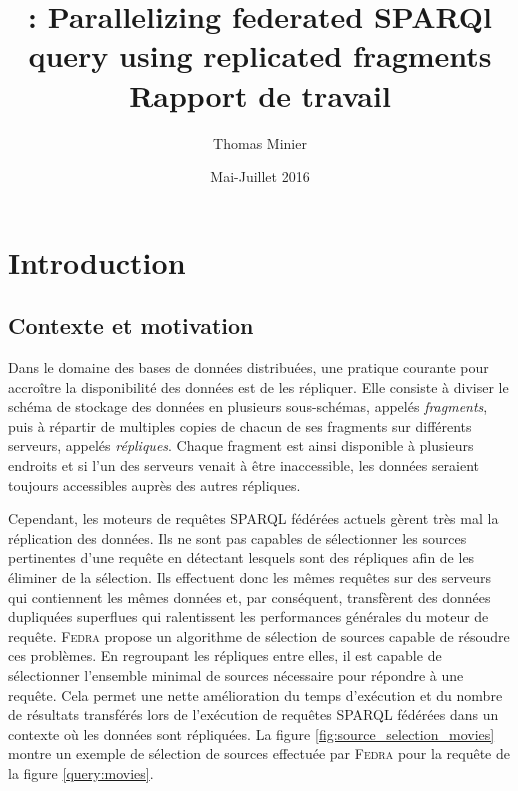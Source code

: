 \documentclass[a4paper]{article}
\title{\peneloop : Parallelizing federated SPARQl query using replicated fragments\\Rapport de travail}
\author{Thomas Minier}
\date{Mai-Juillet 2016}
\def\fedra{\textsc{Fedra}\xspace}
\begin{document}
\maketitle

\tableofcontents

\newpage

\section{Introduction}

\subsection{Contexte et motivation}

Dans le domaine des bases de données distribuées, une pratique courante pour accroître la disponibilité des données est de les répliquer. Elle consiste à diviser le schéma de stockage des données en plusieurs sous-schémas, appelés \textit{fragments}, puis à répartir de multiples copies de chacun de ses fragments sur différents serveurs, appelés \textit{répliques}. Chaque fragment est ainsi disponible à plusieurs endroits et si l'un des serveurs venait à être inaccessible, les données seraient toujours accessibles auprès des autres répliques.

Cependant, les moteurs de requêtes SPARQL fédérées actuels \cite{schwarte2011fedx,acosta2011anapsid} gèrent très mal la réplication des données. Ils ne sont pas capables de sélectionner les sources pertinentes d'une requête en détectant lesquels sont des répliques afin de les éliminer de la sélection. Ils effectuent donc les mêmes requêtes sur des serveurs qui contiennent les mêmes données et, par conséquent, transfèrent des données dupliquées superflues qui ralentissent les performances générales du moteur de requête. \fedra \cite{montoya2014fedra} propose un algorithme de sélection de sources capable de résoudre ces problèmes. En regroupant les répliques entre elles, il est capable de sélectionner l'ensemble minimal de sources nécessaire pour répondre à une requête. Cela permet une nette amélioration du temps d'exécution et du nombre de résultats transférés lors de l'exécution de requêtes SPARQL fédérées dans un contexte où les données sont répliquées. La figure \ref{fig:source_selection_movies} montre un exemple de sélection de sources effectuée par \fedra pour la requête de la figure \ref{query:movies}.


\end{document}
